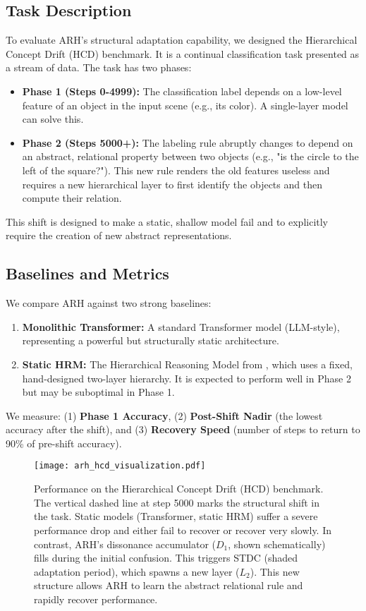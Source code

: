 \documentclass{article}
\begin{document}
\subsection{Task Description}
To evaluate ARH's structural adaptation capability, we designed the Hierarchical Concept Drift (HCD) benchmark. It is a continual classification task presented as a stream of data. The task has two phases:
\begin{itemize}
    \item \textbf{Phase 1 (Steps 0-4999):} The classification label depends on a low-level feature of an object in the input scene (e.g., its color). A single-layer model can solve this.
    \item \textbf{Phase 2 (Steps 5000+):} The labeling rule abruptly changes to depend on an abstract, relational property between two objects (e.g., "is the circle to the left of the square?"). This new rule renders the old features useless and requires a new hierarchical layer to first identify the objects and then compute their relation.
\end{itemize}
This shift is designed to make a static, shallow model fail and to explicitly require the creation of new abstract representations.

\subsection{Baselines and Metrics}
We compare ARH against two strong baselines:
\begin{enumerate}
    \item \textbf{Monolithic Transformer:} A standard Transformer model (LLM-style), representing a powerful but structurally static architecture.
    \item \textbf{Static HRM:} The Hierarchical Reasoning Model from \citet{HRM2025}, which uses a fixed, hand-designed two-layer hierarchy. It is expected to perform well in Phase 2 but may be suboptimal in Phase 1.
\end{enumerate}
We measure: (1) \textbf{Phase 1 Accuracy}, (2) \textbf{Post-Shift Nadir} (the lowest accuracy after the shift), and (3) \textbf{Recovery Speed} (number of steps to return to 90\% of pre-shift accuracy).

\begin{figure}[h!]
    \centering
    \texttt{[image: arh\_hcd\_visualization.pdf]}
    \caption{Performance on the Hierarchical Concept Drift (HCD) benchmark. The vertical dashed line at step 5000 marks the structural shift in the task. Static models (Transformer, static HRM) suffer a severe performance drop and either fail to recover or recover very slowly. In contrast, ARH's dissonance accumulator ($D_1$, shown schematically) fills during the initial confusion. This triggers STDC (shaded adaptation period), which spawns a new layer ($L_2$). This new structure allows ARH to learn the abstract relational rule and rapidly recover performance.}
    \label{fig:performance_plot}
\end{figure}
\end{document}
